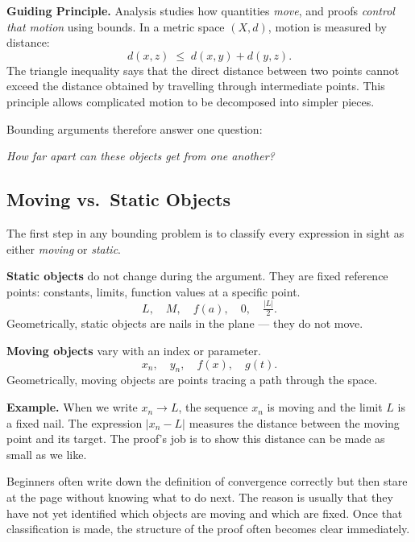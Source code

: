 \begin{tcolorbox}[colback=thmbox, colframe=thmborder, arc=2pt,
  left=8pt, right=8pt, top=6pt, bottom=6pt]
\textbf{Guiding Principle.}
Analysis studies how quantities \emph{move}, and proofs
\emph{control that motion} using bounds.
In a metric space $(X,d)$, motion is measured by distance:
\[
  d(x,z) \;\le\; d(x,y) + d(y,z).
\]
The triangle inequality says that the direct distance between two points
cannot exceed the distance obtained by travelling through intermediate points.
This principle allows complicated motion to be decomposed into simpler pieces.
\end{tcolorbox}

\medskip

Bounding arguments therefore answer one question:
\begin{center}
  \emph{How far apart can these objects get from one another?}
\end{center}

\subsection{Moving vs.\ Static Objects}

The first step in any bounding problem is to classify every expression
in sight as either \emph{moving} or \emph{static}.

\medskip
\noindent\textbf{Static objects} do not change during the argument.
They are fixed reference points: constants, limits, function values
at a specific point.
\[
  L,\quad M,\quad f(a),\quad 0,\quad \tfrac{|L|}{2}.
\]
Geometrically, static objects are nails in the plane — they do not move.

\medskip
\noindent\textbf{Moving objects} vary with an index or parameter.
\[
  x_n,\quad y_n,\quad f(x),\quad g(t).
\]
Geometrically, moving objects are points tracing a path through the space.

\medskip
\noindent\textbf{Example.} When we write $x_n \to L$, the sequence $x_n$
is moving and the limit $L$ is a fixed nail.
The expression $|x_n - L|$ measures the distance between the moving
point and its target.
The proof's job is to show this distance can be made as small as we like.

\begin{remark*}
Beginners often write down the definition of convergence correctly but
then stare at the page without knowing what to do next.
The reason is usually that they have not yet identified which objects
are moving and which are fixed.
Once that classification is made, the structure of the proof often
becomes clear immediately.
\end{remark*}

